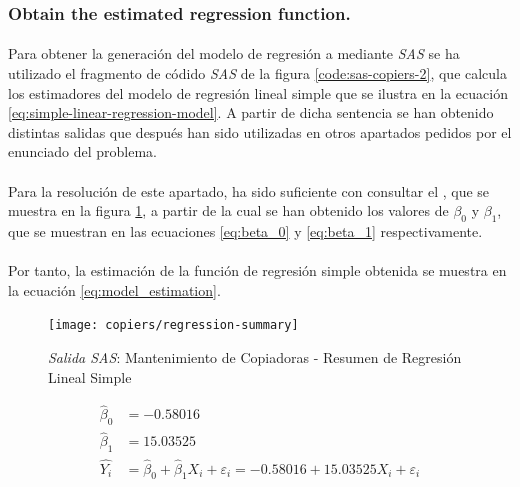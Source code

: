 \documentclass{article}
\begin{document}
      \subsubsection{Obtain the estimated regression function.}

        \paragraph{}
        Para obtener la generación del modelo de regresión a mediante \emph{SAS} se ha utilizado el fragmento de códido \emph{SAS} de la figura \ref{code:sas-copiers-2}, que calcula los estimadores del modelo de regresión lineal simple que se ilustra en la ecuación \eqref{eq:simple-linear-regression-model}. A partir de dicha sentencia se han obtenido distintas salidas que después han sido utilizadas en otros apartados pedidos por el enunciado del problema.

        \paragraph{}
        Para la resolución de este apartado, ha sido suficiente con consultar el , que se muestra en la figura \ref{img:copiers-regression-summary}, a partir de la cual se han obtenido los valores de $\beta_0$ y $\beta_1$, que se muestran en las ecuaciones \eqref{eq:beta_0} y \eqref{eq:beta_1} respectivamente.

        \paragraph{}
        Por tanto, la estimación de la función de regresión simple obtenida se muestra en la ecuación \eqref{eq:model_estimation}.

        \begin{figure}[H]
          \centering
          \texttt{[image: copiers/regression-summary]}
          \caption{\emph{Salida SAS}: Mantenimiento de Copiadoras - Resumen de Regresión Lineal Simple}
          \label{img:copiers-regression-summary}
        \end{figure}

        \begin{align}
        \label{eq:beta_0}
          \widehat{\beta}_0 &= -0.58016\\
        \label{eq:beta_1}
          \widehat{\beta}_1 &= 15.03525\\
        \label{eq:model_estimation}
          \widehat{Y_i} &= \widehat{\beta}_0 +\widehat{\beta}_1X_i + \varepsilon_i = -0.58016 + 15.03525 X_i + \varepsilon_i
        \end{align}
\end{document}
